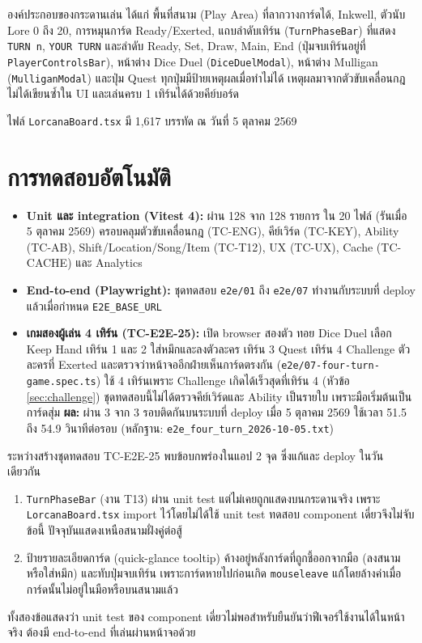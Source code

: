 องค์ประกอบของกระดานเล่น ได้แก่ พื้นที่สนาม (Play Area) ที่ลากวางการ์ดได้, Inkwell, ตัวนับ Lore 0 ถึง 20, การหมุนการ์ด Ready/Exerted, แถบลำดับเทิร์น (\texttt{TurnPhaseBar}) ที่แสดง \texttt{TURN n}, \texttt{YOUR TURN} และลำดับ Ready, Set, Draw, Main, End (ปุ่มจบเทิร์นอยู่ที่ \texttt{PlayerControlsBar}), หน้าต่าง Dice Duel (\texttt{DiceDuelModal}), หน้าต่าง Mulligan (\texttt{MulliganModal}) และปุ่ม Quest ทุกปุ่มมีป้ายเหตุผลเมื่อทำไม่ได้ เหตุผลมาจากตัวขับเคลื่อนกฎ ไม่ได้เขียนซ้ำใน UI และเล่นครบ 1 เทิร์นได้ด้วยคีย์บอร์ด

ไฟล์ \texttt{LorcanaBoard.tsx} มี 1,617 บรรทัด ณ วันที่ 5 ตุลาคม 2569 

\section{การทดสอบอัตโนมัติ}

\begin{itemize}
    \item \textbf{Unit และ integration (Vitest 4):} ผ่าน 128 จาก 128 รายการ ใน 20 ไฟล์ (รันเมื่อ 5 ตุลาคม 2569) ครอบคลุมตัวขับเคลื่อนกฎ (TC-ENG), คีย์เวิร์ด (TC-KEY), Ability (TC-AB), Shift/Location/Song/Item (TC-T12), UX (TC-UX), Cache (TC-CACHE) และ Analytics
    \item \textbf{End-to-end (Playwright):} ชุดทดสอบ \texttt{e2e/01} ถึง \texttt{e2e/07} ทำงานกับระบบที่ deploy แล้วเมื่อกำหนด \texttt{E2E\_BASE\_URL} 
    \item \textbf{เกมสองผู้เล่น 4 เทิร์น (TC-E2E-25):} เปิด browser สองตัว ทอย Dice Duel เลือก Keep Hand เทิร์น 1 และ 2 ใส่หมึกและลงตัวละคร เทิร์น 3 Quest เทิร์น 4 Challenge ตัวละครที่ Exerted และตรวจว่าหน้าจออีกฝ่ายเห็นการ์ดตรงกัน (\texttt{e2e/07-four-turn-game.spec.ts}) ใช้ 4 เทิร์นเพราะ Challenge เกิดได้เร็วสุดที่เทิร์น 4 (หัวข้อ \ref{sec:challenge}) ชุดทดสอบนี้ไม่ได้ตรวจคีย์เวิร์ดและ Ability เป็นรายใบ เพราะมือเริ่มต้นเป็นการ์ดสุ่ม \textbf{ผล:} ผ่าน 3 จาก 3 รอบติดกันบนระบบที่ deploy เมื่อ 5 ตุลาคม 2569 ใช้เวลา 51.5 ถึง 54.9 วินาทีต่อรอบ (หลักฐาน: \texttt{e2e\_four\_turn\_2026-10-05.txt})
\end{itemize}

ระหว่างสร้างชุดทดสอบ TC-E2E-25 พบข้อบกพร่องในแอป 2 จุด ซึ่งแก้และ deploy ในวันเดียวกัน
\begin{enumerate}
    \item \texttt{TurnPhaseBar} (งาน T13) ผ่าน unit test แต่ไม่เคยถูกแสดงบนกระดานจริง เพราะ \texttt{LorcanaBoard.tsx} import ไว้โดยไม่ได้ใช้ unit test ทดสอบ component เดี่ยวจึงไม่จับข้อนี้ ปัจจุบันแสดงเหนือสนามฝั่งคู่ต่อสู้
    \item ป้ายรายละเอียดการ์ด (quick-glance tooltip) ค้างอยู่หลังการ์ดที่ถูกชี้ออกจากมือ (ลงสนามหรือใส่หมึก) และทับปุ่มจบเทิร์น เพราะการ์ดหายไปก่อนเกิด \texttt{mouseleave} แก้โดยล้างค่าเมื่อการ์ดนั้นไม่อยู่ในมือหรือบนสนามแล้ว
\end{enumerate}
ทั้งสองข้อแสดงว่า unit test ของ component เดี่ยวไม่พอสำหรับยืนยันว่าฟีเจอร์ใช้งานได้ในหน้าจริง ต้องมี end-to-end ที่เล่นผ่านหน้าจอด้วย


